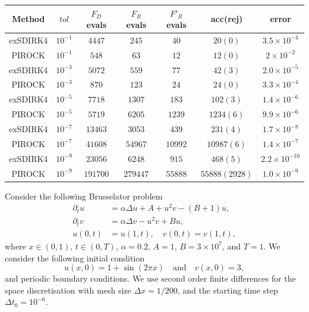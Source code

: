 \documentclass[10pt,a4paper]{article}
\begin{document}
	\begin{table}[b!]
		\centering
		\begin{tabular}{|c|c|c|c|c|c|c|}
			\hline
			Method & $tol$   &  $F_D$ evals & $F_R$ evals &  $F'_R$ evals &  acc(rej) & error \\
			\hline
			exSDIRK4 & $10^{-1}$ & $4447$ & $245$ & $40$ & $20(0)$ & $3.5\times 10^{-4}$\\
			PIROCK & $10^{-1}$ & $548$ & $63$ & $12$ & $12(0)$ & $2\times 10^{-2}$ \\
			\hline
			exSDIRK4 & $10^{-3}$ & $5072$ & $559$ & $77$ & $42(3)$ &$2.0\times 10^{-5}$ \\
			PIROCK & $10^{-3}$ & $870$ & $123$ & $24$ & $24(0)$ & $3.3\times 10^{-4}$ \\
			\hline
			exSDIRK4 & $10^{-5}$ & $7718$ & $1307$ & $183$ & $102(3)$ & $1.4\times10^{-6}$ \\
			PIROCK & $10^{-5}$ & $5719$ & $6205$ & $1239$ & $1234(6)$ & $9.9\times10^{-6}$\\
			\hline
			exSDIRK4 & $10^{-7}$ & $13463$ & $3053$ & $439$ & $231(4)$ & $1.7\times10^{-8}$\\
			PIROCK & $10^{-7}$ & $41608$ & $54967$ & $10992$ & $10987(6)$ & $1.4\times10^{-7}$\\
			\hline
			exSDIRK4 & $10^{-9}$ & $23056$ & $6248$ & $915$ & $468(5)$ & $2.2\times10^{-10}$\\
			PIROCK & $10^{-9}$ & $191700$ & $279447$ & $55888$ & $55888(2928)$ & $1.0\times10^{-9}$\\
			\hline
		\end{tabular}
		\label{table:bruss}
	\end{table}
	Consider the following Brusselator problem
	\begin{equation}\label{eq:bruss1d}
		\begin{split}
		\partial_t u &= \alpha\Delta u + A +u^2v - (B+1)u,\\
		\partial_t v &= \alpha\Delta v -u^2v + Bu,\\
        u(0,t)&=u(1,t), \quad v(0,t)=v(1,t),
		\end{split}
	\end{equation}
	where $x\in (0,1)$, $t\in (0,T)$, $\alpha=0.2$, $A=1$, $B=3\times 10^7$, and $T=1$. We consider the following initial condition
	$$
	u(x,0)=1+\sin(2\pi x) \quad \text{and} \quad v(x,0)=3, 
	$$
    and periodic boundary conditions.
	We use second order finite differences for the space discretisation with mesh size $\Delta x =1/200$, and the starting time step $\Delta t_0=10^{-6}$. %
\end{document}
